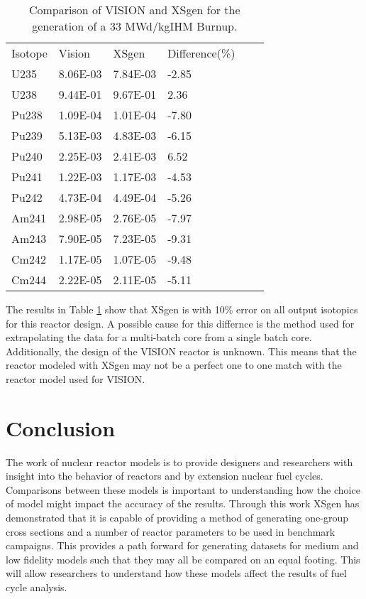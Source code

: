 \documentclass{article}
\begin{document}
\begin{table}[!htb]
\centering
\caption{Comparison of VISION and XSgen for the generation of a 33 MWd/kgIHM Burnup.}
\label{tab:recipe}
\begin{tabular}{llllll}
Isotope & Vision & XSgen & Difference(\%) \\
U235 & 8.06E-03 & 7.84E-03 & -2.85 \\
U238 & 9.44E-01 & 9.67E-01 & 2.36 \\
Pu238 & 1.09E-04 & 1.01E-04 & -7.80 \\
Pu239 & 5.13E-03 & 4.83E-03 & -6.15 \\
Pu240 & 2.25E-03 & 2.41E-03 & 6.52 \\
Pu241 & 1.22E-03 & 1.17E-03 & -4.53 \\
Pu242 & 4.73E-04 & 4.49E-04 & -5.26 \\
Am241 & 2.98E-05 & 2.76E-05 & -7.97 \\
Am243 & 7.90E-05 & 7.23E-05 & -9.31 \\
Cm242 & 1.17E-05 & 1.07E-05 & -9.48 \\
Cm244 & 2.22E-05 & 2.11E-05 & -5.11 \\
\end{tabular}
\end{table}

The results in Table \ref{tab:recipe} show that XSgen is with 10\% error on all output isotopics for this reactor design. A possible cause for this differnce is the method used for extrapolating the data for a multi-batch core from a single batch core. Additionally, the design of the VISION reactor is unknown. This means that the reactor modeled with XSgen may not be a perfect one to one match with the reactor model used for VISION.

\section{Conclusion}
The work of nuclear reactor models is to provide designers and researchers with insight into the behavior of reactors and by extension nuclear fuel cycles. Comparisons between these models is important to understanding how the choice of model might impact the accuracy of the results. Through this work XSgen has demonstrated that it is capable of providing a method of generating one-group cross sections and a number of reactor parameters to be used in benchmark campaigns. This provides a path forward for generating datasets for medium and low fidelity models such that they may all be compared on an equal footing. This will allow researchers to understand how these models affect the results of fuel cycle analysis.
\end{document}
